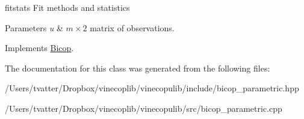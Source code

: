 fitstats Fit methods and statistics


\begin{DoxyParams}{Parameters}
{\em u} & $m \times 2$ matrix of observations. \\
\hline
\end{DoxyParams}


Implements \hyperlink{class_bicop_a0ff40d8054e11ed8aaa4956c7fd84e89}{Bicop}.



The documentation for this class was generated from the following files\+:\begin{DoxyCompactItemize}
\item 
/\+Users/tvatter/\+Dropbox/vinecoplib/vinecopulib/include/bicop\+\_\+parametric.\+hpp\item 
/\+Users/tvatter/\+Dropbox/vinecoplib/vinecopulib/src/bicop\+\_\+parametric.\+cpp\end{DoxyCompactItemize}
